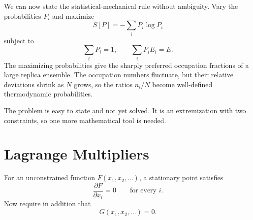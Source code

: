 We can now state the statistical-mechanical rule without ambiguity. Vary the
probabilities \(P_i\) and maximize
\begin{equation}
 S[P]=-\sum_iP_i\log P_i
 \label{eq:sm3-maximize-entropy}
\end{equation}
subject to
\begin{equation}
 \sum_iP_i=1,
 \qquad
 \sum_iP_iE_i=\overline E.
 \label{eq:sm3-maxent-constraints}
\end{equation}
The maximizing probabilities give the sharply preferred occupation fractions
of a large replica ensemble. The occupation numbers fluctuate, but their
relative deviations shrink as \(N\) grows, so the ratios \(n_i/N\) become
well-defined thermodynamic probabilities.

\begin{classroomqa}
\end{classroomqa}

The problem is easy to state and not yet solved. It is an extremization with
two constraints, so one more mathematical tool is needed.

\section{Lagrange Multipliers}

For an unconstrained function \(F(x_1,x_2,\ldots)\), a stationary point
satisfies
\begin{equation}
 \frac{\partial F}{\partial x_i}=0
 \qquad\text{for every }i.
 \label{eq:sm3-unconstrained-stationary}
\end{equation}
Now require in addition that
\begin{equation}
 G(x_1,x_2,\ldots)=0.
 \label{eq:sm3-one-constraint}
\end{equation}

\begin{classroomqa}
\end{classroomqa}

